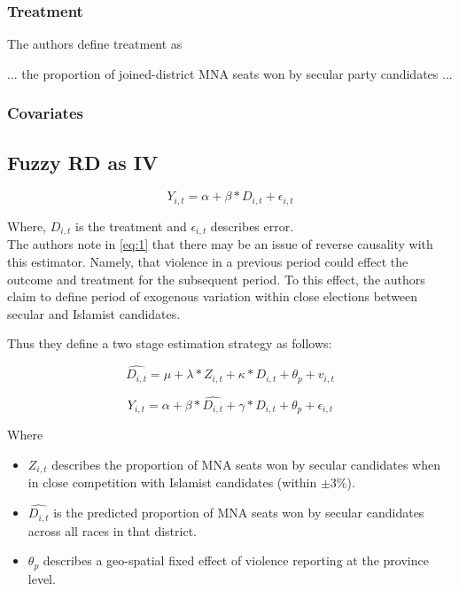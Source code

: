 \documentclass{scrartcl}
\begin{document}
\subsubsection{Treatment}

The authors define treatment as

\begin{displayquote}
... the proportion of joined-district MNA seats
  won by secular party candidates ...
\end{displayquote}


\subsubsection{Covariates}

\subsection{Fuzzy RD as IV}

\begin{equation} \label{eq:1}
  Y_{i,t} = \alpha + \beta * D_{i,t} + \epsilon_{i,t}
\end{equation}

Where, $D_{i,t}$ is the treatment and $\epsilon_{i,t}$ describes error.\\

The authors note in \ref{eq:1} that there may be an issue of reverse causality with this estimator. Namely, that violence in a previous period could effect the outcome and treatment for the subsequent period.
To this effect, the authors claim to define period of exogenous variation within close elections between secular and Islamist candidates.

Thus they define a two stage estimation strategy as follows:


\begin{equation} \label{eq:2}
  \widehat{D_{i,t}} = \mu + \lambda * Z_{i,t} + \kappa*D_{i,t} + \theta_p + v_{i,t}
\end{equation}

\begin{equation} \label{eq:3}
  Y_{i,t} = \alpha + \beta * \widehat{D_{i,t}} + \gamma*D_{i,t} + \theta_{p} + \epsilon_{i,t}
\end{equation}

Where

\begin{itemize}
\item $Z_{i,t}$ describes the proportion of MNA seats won by secular candidates when in close competition with Islamist candidates (within $\pm 3\%$).
\item $\widehat{D_{i,t}}$ is the predicted proportion of MNA seats won by secular candidates across all races in that district.
\item $\theta_p$ describes a geo-spatial fixed effect of violence reporting at the province level. 
\end{itemize}
\end{document}
